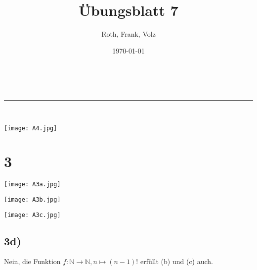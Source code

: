 \documentclass[a4paper,11pt]{article}
\makeatletter
\newcommand{\linia}{\rule{\linewidth}{0.5pt}}
\theoremstyle{mytheor}
\renewcommand{\maketitle}{
\begin{center}
\vspace{2ex}
{\huge \textsc{\@title}}
\vspace{1ex}
\\
\linia\\
\@author \hfill \@date
\vspace{4ex}
\end{center}
}
\makeatother
\begin{document}
\title{Übungsblatt 7}

\author{Roth, Frank, Volz}

\date{\today}

\maketitle

%



\texttt{[image: A4.jpg]}

\section*{3}

\texttt{[image: A3a.jpg]}

\texttt{[image: A3b.jpg]}

\texttt{[image: A3c.jpg]}

\subsection*{3d)}

Nein, die Funktion $f:\mathbb{N} \rightarrow \mathbb{N}, n \mapsto (n-1)!$ erfüllt (b) und (c) auch.
\end{document}
